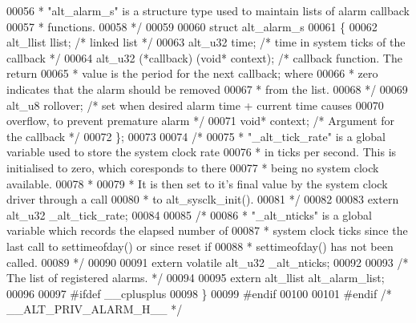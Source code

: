 \begin{DoxyCode}
00056 \textcolor{comment}{ * "alt\_alarm\_s" is a structure type used to maintain lists of alarm callback}
00057 \textcolor{comment}{ * functions.}
00058 \textcolor{comment}{ */}
00059 
00060 \textcolor{keyword}{struct }alt_alarm_s
00061 \{
00062   alt_llist llist;       \textcolor{comment}{/* linked list */}
00063   alt_u32 time;          \textcolor{comment}{/* time in system ticks of the callback */}
00064   alt_u32 (*callback) (\textcolor{keywordtype}{void}* context); \textcolor{comment}{/* callback function. The return }
00065 \textcolor{comment}{                          * value is the period for the next callback; where }
00066 \textcolor{comment}{                          * zero indicates that the alarm should be removed }
00067 \textcolor{comment}{                          * from the list. }
00068 \textcolor{comment}{                          */}
00069   alt_u8 rollover;       \textcolor{comment}{/* set when desired alarm time + current time causes}
00070 \textcolor{comment}{                            overflow, to prevent premature alarm */}
00071   \textcolor{keywordtype}{void}* context;         \textcolor{comment}{/* Argument for the callback */}
00072 \};
00073 
00074 \textcolor{comment}{/*}
00075 \textcolor{comment}{ * "\_alt\_tick\_rate" is a global variable used to store the system clock rate }
00076 \textcolor{comment}{ * in ticks per second. This is initialised to zero, which coresponds to there}
00077 \textcolor{comment}{ * being no system clock available. }
00078 \textcolor{comment}{ *}
00079 \textcolor{comment}{ * It is then set to it's final value by the system clock driver through a call}
00080 \textcolor{comment}{ * to alt\_sysclk\_init(). }
00081 \textcolor{comment}{ */}
00082 
00083 \textcolor{keyword}{extern} alt_u32 _alt_tick_rate;
00084 
00085 \textcolor{comment}{/*}
00086 \textcolor{comment}{ * "\_alt\_nticks" is a global variable which records the elapsed number of }
00087 \textcolor{comment}{ * system clock ticks since the last call to settimeofday() or since reset if}
00088 \textcolor{comment}{ * settimeofday() has not been called.}
00089 \textcolor{comment}{ */}
00090 
00091 \textcolor{keyword}{extern} \textcolor{keyword}{volatile} alt_u32 _alt_nticks;
00092 
00093 \textcolor{comment}{/* The list of registered alarms. */}
00094 
00095 \textcolor{keyword}{extern} alt_llist alt_alarm_list;
00096 
00097 \textcolor{preprocessor}{#ifdef \_\_cplusplus}
00098 \}
00099 \textcolor{preprocessor}{#endif}
00100 
00101 \textcolor{preprocessor}{#endif }\textcolor{comment}{/* \_\_ALT\_PRIV\_ALARM\_H\_\_ */}\textcolor{preprocessor}{}
\end{DoxyCode}
